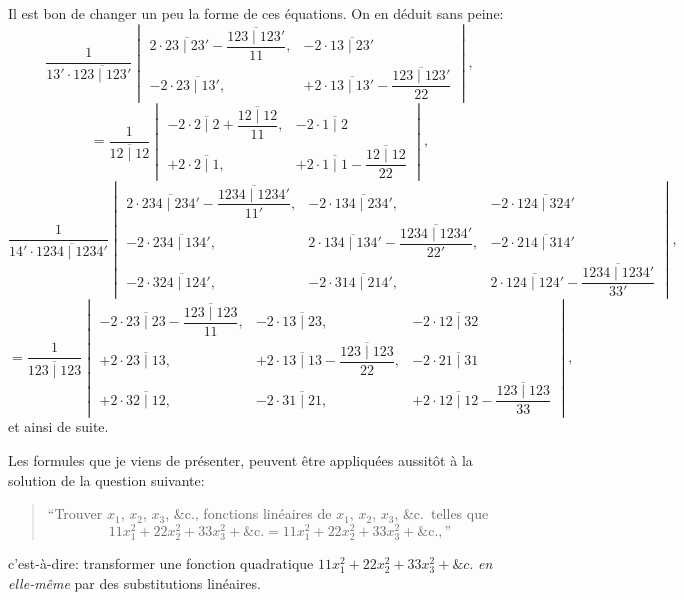 \documentclass[11pt,a4paper]{book}
\begin{document}
Il est bon de changer un peu la forme de ces \'{e}quations. On en d\'{e}duit sans peine:
\[
\frac{1}{13' \cdot \overline{123 \mid 123'}}
\begin{vmatrix}
2 \cdot \overline{23 \mid 23'} - \dfrac{\overline{123 \mid 123'}}{11}, &
-2 \cdot \overline{13 \mid 23'} \\[1em]
-2 \cdot \overline{23 \mid 13'}, &
+2 \cdot \overline{13 \mid 13'} - \dfrac{\overline{123 \mid 123'}}{22}
\end{vmatrix},
\]
\[
= \frac{1}{\overline{12 \mid 12}}
\begin{vmatrix}
-2 \cdot \overline{2 \mid 2} + \dfrac{\overline{12 \mid 12}}{11}, &
-2 \cdot \overline{1 \mid 2} \\[1em]
+2 \cdot \overline{2 \mid 1}, &
+2 \cdot \overline{1 \mid 1} - \dfrac{\overline{12 \mid 12}}{22}
\end{vmatrix},
\]
\[
\frac{1}{14' \cdot \overline{1234 \mid 1234'}}
\begin{vmatrix}
2 \cdot \overline{234 \mid 234'} - \dfrac{\overline{1234 \mid 1234'}}{11'}, &
-2 \cdot \overline{134 \mid 234'}, &
-2 \cdot \overline{124 \mid 324'} \\[1em]
-2 \cdot \overline{234 \mid 134'}, &
2 \cdot \overline{134 \mid 134'} - \dfrac{\overline{1234 \mid 1234'}}{22'}, &
-2 \cdot \overline{214 \mid 314'} \\[1em]
-2 \cdot \overline{324 \mid 124'}, &
-2 \cdot \overline{314 \mid 214'}, &
2 \cdot \overline{124 \mid 124'} - \dfrac{\overline{1234 \mid 1234'}}{33'}
\end{vmatrix},
\]
\[
= \frac{1}{\overline{123 \mid 123}}
\begin{vmatrix}
-2 \cdot \overline{23 \mid 23} - \dfrac{\overline{123 \mid 123}}{11}, &
-2 \cdot \overline{13 \mid 23}, &
-2 \cdot \overline{12 \mid 32} \\[1em]
+2 \cdot \overline{23 \mid 13}, &
+2 \cdot \overline{13 \mid 13} - \dfrac{\overline{123 \mid 123}}{22}, &
-2 \cdot \overline{21 \mid 31} \\[1em]
+2 \cdot \overline{32 \mid 12}, &
-2 \cdot \overline{31 \mid 21}, &
+2 \cdot \overline{12 \mid 12} - \dfrac{\overline{123 \mid 123}}{33}
\end{vmatrix},
\]
et ainsi de suite.

Les formules que je viens de pr\'{e}senter, peuvent \^{e}tre appliqu\'{e}es aussit\^{o}t \`{a} la solution de la question suivante:

\begin{quote}
``Trouver $x_1$, $x_2$, $x_3$, \&c., fonctions lin\'{e}aires de $x_1$, $x_2$, $x_3$, \&c.\ telles que
\[
11 x_1^2 + 22 x_2^2 + 33 x_3^2 + \text{\&c.} = 11 x_1^2 + 22 x_2^2 + 33 x_3^2 + \text{\&c.},\text{''}
\]
\end{quote}
c'est-\`{a}-dire: transformer une fonction quadratique $11x_1^2 + 22x_2^2 + 33x_3^2 + \&c.$ \textit{en elle-m\^{e}me} par des substitutions lin\'{e}aires.
\end{document}
